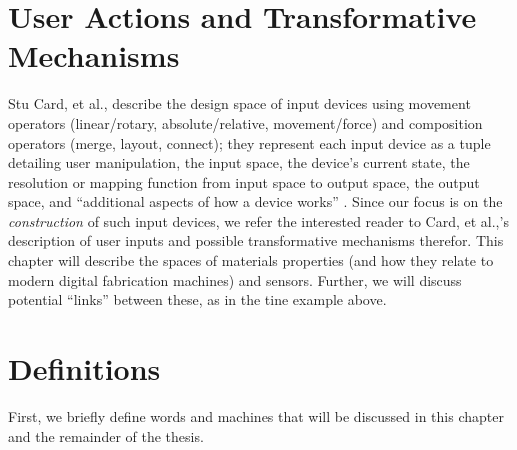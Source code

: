 \section{User Actions and Transformative Mechanisms}

Stu Card, et al., describe the design space of input devices using movement operators (linear/rotary, absolute/relative, movement/force) and composition operators (merge, layout, connect); they represent each input device as a tuple detailing user manipulation, the input space, the device's current state, the resolution or mapping function from input space to output space, the output space, and ``additional aspects of how a device works'' \cite{card-input}. Since our focus is on the \emph{construction} of such input devices, we refer the interested reader to Card, et al.,'s description of user inputs and possible transformative mechanisms therefor. This chapter will describe the spaces of materials properties (and how they relate to modern digital fabrication machines) and sensors. Further, we will discuss potential ``links'' between these, as in the tine example above.

\section{Definitions}

First, we briefly define words and machines that will be discussed in this chapter and the remainder of the thesis.

